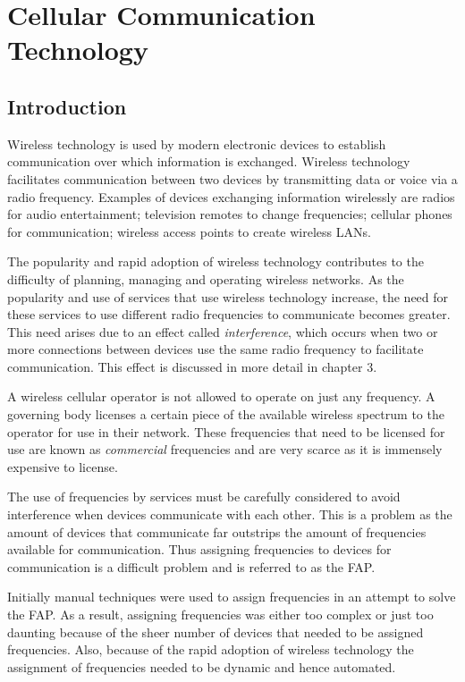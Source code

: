 \chapter{Cellular Communication Technology}
\label{chpt:celltech}
\section{Introduction}
 Wireless technology is used by modern electronic devices to establish communication over which information is exchanged\cite{Karen2004}. Wireless technology facilitates communication between two devices by transmitting data or voice via a radio frequency\cite{Karen2004}. Examples of devices exchanging information wirelessly are radios for audio entertainment; television remotes to change frequencies; cellular phones for communication; wireless access points to create wireless LANs\cite{Karen2004}.

The popularity and rapid adoption of wireless technology contributes to the difficulty of planning, managing and operating wireless networks\cite{Karen2004}. As the popularity and use of services that use wireless technology increase, the need for these services to use different radio frequencies to communicate becomes greater\cite{wirelesstelcoMullet}. This need arises due to an effect called \emph{interference}, which occurs when two or more connections between devices use the same radio frequency to facilitate communication\cite{wirelesstelcoMullet}. This effect is discussed in more detail in chapter 3.

A wireless cellular operator is not allowed to operate on just any frequency. A governing body licenses a certain piece of the available wireless spectrum to the operator for use in their network\cite{FAPRAMColouring}. These frequencies that need to be licensed for use are known as \emph{commercial} frequencies and are very scarce as it is immensely expensive to license\cite{FAPRAMColouring}. 

The use of frequencies by services must be carefully considered to avoid interference when devices communicate with each other. This is a problem as the amount of devices that communicate far outstrips the amount of frequencies available for communication\cite{wirelesstelcoMullet}. Thus assigning frequencies to devices for communication is a difficult problem and is referred to as the \gls{FAP}\cite{Karen2004,Eisenblatter}.

Initially manual techniques were used to assign frequencies in an attempt to solve the \gls{FAP}\cite{Karen2004}. As a result, assigning frequencies was either too complex or just too daunting because of the sheer number of devices that needed to be assigned frequencies\cite{Karen2004}. Also, because of the rapid adoption of wireless technology the assignment of frequencies needed to be dynamic and hence automated\cite{Karen2004}.

